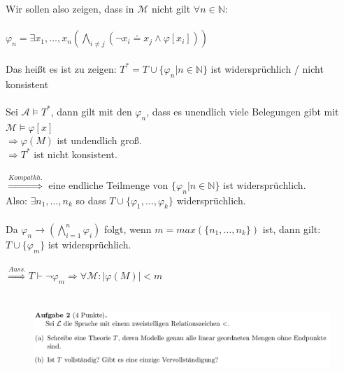 \documentclass[a4paper]{scrartcl}
\begin{document}
    Wir sollen also zeigen, dass in $\mathcal{M}$ nicht gilt $\forall n \in \mathds{N}$:\\
    \\$\varphi_n = \exists x_1,\dots,x_n(\bigwedge_{i \neq j} (\neg x_i \doteq x_j \land \varphi[x_i]))$\\
    \\Das heißt es ist zu zeigen: $T^* = T \cup \{\varphi_n | n \in \mathds{N}\}$ ist widersprüchlich / nicht konsistent\\
    \\Sei $\mathcal{A} \vDash T^*$, dann gilt mit den $\varphi_n$, dass es unendlich viele Belegungen gibt mit $\mathcal{M} \vDash \varphi[x]$\\
    $\Rightarrow \varphi(M)$ ist undendlich groß.\\
    $\Rightarrow T^*$ ist nicht konsistent.\\
    \\$\overset{Kompatkh.}{\Rightarrow}$ eine endliche Teilmenge von $\{\varphi_n | n \in \mathds{N}\}$ ist widersprüchlich.\\
    Also: $\exists n_1,\dots,n_k$ so dass $T \cup \{\varphi_1,\dots,\varphi_k\}$ widersprüchlich.\\
    \\Da $\varphi_n \rightarrow (\bigwedge_{i=1}^n \varphi_i)$ folgt, wenn $m = max(\{n_1, \dots, n_k\})$ ist, dann gilt:\\
    $T \cup \{\varphi_m\}$ ist widersprüchlich.\\
    \\$\overset{Auss.}{\Rightarrow} T \vdash \neg \varphi_m \Rightarrow \forall \mathcal{M}: |\varphi(M)| < m$\\


\newpage

\section*{}%
\label{sec:aufgabe_2}

    \begin{figure}[H]
        \centering
        \includegraphics[scale=0.3]{./A-2.png}
        \label{fig:}
    \end{figure}
\end{document}
